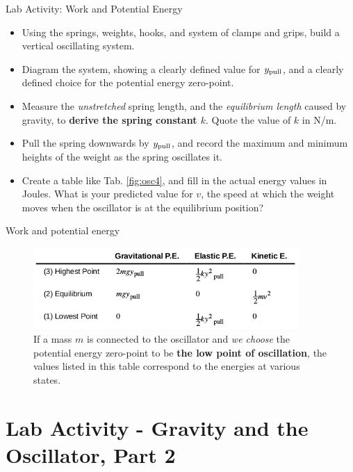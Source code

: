\documentclass{beamer}
\begin{document}
\begin{frame}{Lab Activity: Work and Potential Energy}
\small
\begin{itemize}
\item Using the springs, weights, hooks, and system of clamps and grips, build a vertical oscillating system.
\item Diagram the system, showing a clearly defined value for $y_{\rm pull}$, and a clearly defined choice for the potential energy zero-point.
\item Measure the \textit{unstretched} spring length, and the \textit{equilibrium length} caused by gravity, to \textbf{derive the spring constant $k$}.  Quote the value of $k$ in N/m.
\item Pull the spring downwards by $y_{\rm pull}$, and record the maximum and minimum heights of the weight as the spring oscillates it.
\item Create a table like Tab. \ref{fig:osc4}, and fill in the actual energy values in Joules.  What is your predicted value for $v$, the speed at which the weight moves when the oscillator is at the equilibrium position?
\end{itemize}
\end{frame}

\begin{frame}{Work and potential energy}
\begin{figure}
\centering
\includegraphics[width=0.9\textwidth,trim=0cm 0.1cm 0cm 0cm,clip=true]{figures/table.png}
\caption{\label{fig:osc5} If a mass $m$ is connected to the oscillator and \textit{we choose} the potential energy zero-point to be \textbf{the low point of oscillation}, the values listed in this table correspond to the energies at various states.}
\end{figure}
\end{frame}

\section{Lab Activity - Gravity and the Oscillator, Part 2}
\end{document}

